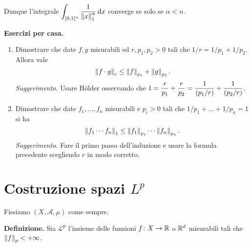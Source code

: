 \documentclass[a4paper, 12pt]{report}
\begin{document}
Dunque l'integrale $\displaystyle \int_{[0,1]^n}^{} \frac{1}{\left\lVert x \right\rVert_1^\alpha} \,\mathrm{d} x$ converge se solo se $\alpha < n$.

\newpage

\textbf{Esercizi per casa.}
\begin{enumerate}[label=(\arabic*)]

\item Dimostrare che date $f,g$ misurabili ed $r,p_1,p_2 > 0$ tali che  $1 / r = 1 / p_1 + 1 / p_2$.
Allora vale
$$
	\left\lVert  f \cdot g  \right\rVert_r \leq \left\lVert  f  \right\rVert_{p_1} + \left\lVert  g  \right\rVert_{p_2}.
$$
\textit{Suggerimento.} Usare Hölder osservando che $\displaystyle 1 = \frac{r}{p_1} + \frac{r}{p_2} = \frac{1}{\left( p_1/r \right)} + \frac{1}{\left( p_2/r \right)}$.

\item Dimostrare che date $f_1,\ldots, f_n$ misurabili e $p_i > 0$ tali che $1/p_1 + \ldots + 1/p_n = 1$ si ha
$$
	\left\lVert  f_1 \cdots f_n  \right\rVert_1 \leq \left\lVert  f_1  \right\rVert_{p_1} \cdots \left\lVert  f_n  \right\rVert_{p_n}.
$$
\textit{Suggerimento.} Fare il primo passo dell'induzione e usare la formula precedente scegliendo $r$ in modo corretto.

\end{enumerate}


%
%

\section{Costruzione spazi $L^p$}

Fissiamo $(X, \mathcal A, \mu)$ come sempre.

\textbf{Definizione.}
Sia $\mathscr L^p$ l'insieme delle funzioni $f \colon X \to \mathbb R$ o $\mathbb R^d$ misurabili tali che $\left\lVert f \right\rVert_p < +\infty$.
\end{document}
